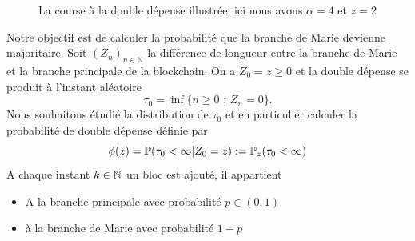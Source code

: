 \begin{figure}[ht!]
\begin{center}
\end{center}
\caption{La course à la double dépense illustrée, ici nous avons $\alpha = 4$ et $z = 2$}
\label{fig:dp_illustration}
\end{figure}
Notre objectif est de calculer la probabilité que la branche de Marie devienne majoritaire. Soit $(Z_n)_{n\in\mathbb{N}}$ la différence de longueur entre la branche de Marie et la branche principale de la blockchain. On a $Z_0 = z\geq 0$ et la double dépense se produit à l'instant aléatoire
\begin{equation}\label{eq:dp_time}
\tau_0 = \inf\{n\geq0\text{ ; }Z_n = 0\}.
\end{equation}
Nous souhaitons étudié la distribution de $\tau_0$ et en particulier calculer la probabilité de double dépense définie par 
\begin{equation}\label{eq:dp_prob}
\phi(z) = \mathbb{P}(\tau_0 <\infty|Z_0 = z) := \mathbb{P}_z(\tau_0 <\infty)
\end{equation}
A chaque instant $k\in\mathbb{N}$ un bloc est ajouté, il appartient 
\begin{itemize}
    \item A la branche principale avec probabilité $p\in(0,1)$
    \item à la branche de Marie avec probabilité $1-p$
\end{itemize}
